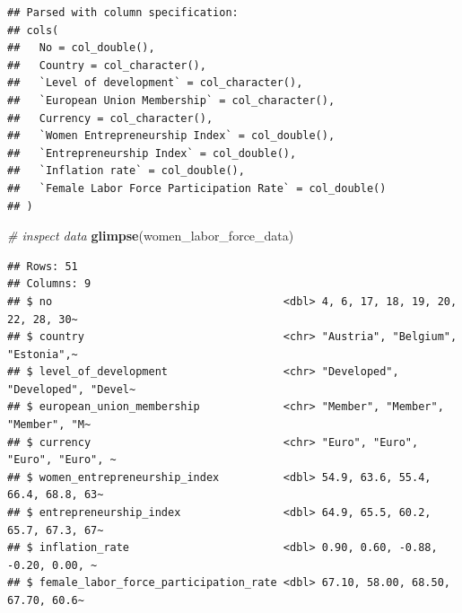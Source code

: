 \documentclass[
]{book}
\newenvironment{Shaded}{\begin{snugshade}}{\end{snugshade}}
\newcommand{\CommentTok}[1]{\textcolor[rgb]{0.56,0.35,0.01}{\textit{#1}}}
\newcommand{\DataTypeTok}[1]{\textcolor[rgb]{0.13,0.29,0.53}{#1}}
\newcommand{\KeywordTok}[1]{\textcolor[rgb]{0.13,0.29,0.53}{\textbf{#1}}}
\newcommand{\NormalTok}[1]{#1}
\newcommand{\OperatorTok}[1]{\textcolor[rgb]{0.81,0.36,0.00}{\textbf{#1}}}
\newcommand{\StringTok}[1]{\textcolor[rgb]{0.31,0.60,0.02}{#1}}
\begin{document}
\begin{Shaded}
\end{Shaded}

\begin{verbatim}
## Parsed with column specification:
## cols(
##   No = col_double(),
##   Country = col_character(),
##   `Level of development` = col_character(),
##   `European Union Membership` = col_character(),
##   Currency = col_character(),
##   `Women Entrepreneurship Index` = col_double(),
##   `Entrepreneurship Index` = col_double(),
##   `Inflation rate` = col_double(),
##   `Female Labor Force Participation Rate` = col_double()
## )
\end{verbatim}

\begin{Shaded}
\begin{Highlighting}[]
\CommentTok{# inspect data}
\KeywordTok{glimpse}\NormalTok{(women_labor_force_data)}
\end{Highlighting}
\end{Shaded}

\begin{verbatim}
## Rows: 51
## Columns: 9
## $ no                                    <dbl> 4, 6, 17, 18, 19, 20, 22, 28, 30~
## $ country                               <chr> "Austria", "Belgium", "Estonia",~
## $ level_of_development                  <chr> "Developed", "Developed", "Devel~
## $ european_union_membership             <chr> "Member", "Member", "Member", "M~
## $ currency                              <chr> "Euro", "Euro", "Euro", "Euro", ~
## $ women_entrepreneurship_index          <dbl> 54.9, 63.6, 55.4, 66.4, 68.8, 63~
## $ entrepreneurship_index                <dbl> 64.9, 65.5, 60.2, 65.7, 67.3, 67~
## $ inflation_rate                        <dbl> 0.90, 0.60, -0.88, -0.20, 0.00, ~
## $ female_labor_force_participation_rate <dbl> 67.10, 58.00, 68.50, 67.70, 60.6~
\end{verbatim}
\end{document}

